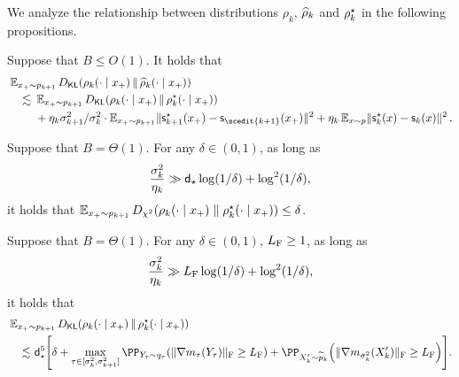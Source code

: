 We analyze the relationship between distributions $\rho_k$, $\widehat{\rho}_k$ and $\rho^\star_k$ in the following propositions. 

\begin{proposition}\label{prop:sc-err-new}
Suppose that $B\leq O(1)$. It holds that
\begin{align}\label{pfeq:sc-err-KL-decomp}
\begin{aligned}
    \MoveEqLeft \En_{x_+\sim p_{k+1}}\Dkl{\rho_k(\cdot\mid x_+)}{\rhohat_k(\cdot\mid x_+)}\\
    \leqsim &~ \En_{x_+\sim p_{k+1}}\Dkl{\rho_k(\cdot\mid x_+)}{\rhostar_k(\cdot\mid x_+)} \\
    &~+\eta_k \sigma_{k+1}^2/\sigma_k^2 \cdot \En_{x_+\sim p_{k+1}}\nrm{\scfs_{k+1}(x_+)-\scf_{\scedit{k+1}}(x_+)}^2
    +\eta_k \En_{x\sim p}\nrm{\scfs_k(x)-\scf_k(x)}^2\,.
\end{aligned}
\end{align}
\end{proposition}

\newcommand{\dbar}{\dstar}

\begin{proposition}\label{prop:intrinsic-chi-sq}
Suppose that $B=\Theta(1)$. For any $\delta\in(0,1)$, as long as
\begin{align}
    \frac{\sigma_k^2}{\eta_k}\gg \dbar\log(1/\delta)+\log^2(1/\delta),
\end{align}
it holds that $\En_{x_+\sim p_{k+1}}\Dchis{\rho_k(\cdot\mid x_+)}{\rhostar_k(\cdot\mid x_+)}\leq \delta$. 
\end{proposition}

\begin{proposition}\label{prop:sqrt-d-simple}
Suppose that $B=\Theta(1)$. For any $\delta\in(0,1)$, $L_{\rm F}\geq 1$, as long as
\begin{align}\label{eq:DM-Lip-Frob-eta}
        \frac{\sigma_k^2}{\eta_k}\gg L_{\rm F} \log(1/\delta)+\log^2(1/\delta),
    \end{align}
it holds that
\begin{align*}
    \MoveEqLeft \En_{x_+\sim p_{k+1}}\Dkl{\rho_k(\cdot\mid x_+)}{\rhostar_k(\cdot\mid x_+)} \\
    \leqsim&~ \dstar^5\brk*{ \delta+\max_{\tau\in[\sigma_k^2,\sigma_{k+1}^2]}\PP_{Y_\tau\sim q_\tau}\prn*{ \nrmF{\nabla m_\tau(Y_\tau)}\geq \LF }+ \PP_{X_k'\sim \wt{p}_k}\prn*{ \nrmF{\nabla m_{\sigma_k^2}(X_k')}\geq \LF }}.
\end{align*}
\end{proposition}


